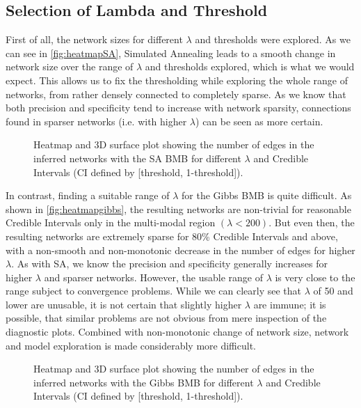 \subsection{Selection of Lambda and Threshold}
First of all, the network sizes for different $\lambda$ and thresholds were explored.
As we can see in \autoref{fig:heatmapSA}, Simulated Annealing leads to a smooth change in network size
over the range of $\lambda$ and thresholds explored, which is what we would expect.
This allows us to fix the thresholding while exploring the whole range of networks, from rather densely connected to completely sparse.
As we know that both precision and specificity tend to increase with network sparsity,
connections found in sparser networks (i.e. with higher $\lambda$) can be seen as more certain.
\begin{figure}[H]
	\centering
	\caption{Heatmap and 3D surface plot showing the number of edges in the inferred networks with the SA BMB for different $\lambda$ and Credible Intervals (\gls{CI} defined by [threshold, 1-threshold]).}
	
	\label{fig:heatmapSA}
\end{figure}


In contrast, finding a suitable range of $\lambda$ for the Gibbs \gls{BMB} is quite difficult.
As shown in \autoref{fig:heatmapgibbs},  the resulting networks are non-trivial for reasonable Credible Intervals only in the multi-modal region $(\lambda<200)$.
But even then, the resulting networks are extremely sparse for 80\% Credible Intervals and above,
with a non-smooth and non-monotonic decrease in the number of edges for higher $\lambda$.
As with SA, we know the precision and specificity generally increases for higher $\lambda$ and sparser networks.
However, the usable range of $\lambda$ is very close to the range subject to convergence problems.
While we can clearly see that $\lambda$ of 50 and lower are unusable, it is not certain that slightly higher $\lambda$
are immune; it is possible, that similar problems are not obvious from mere inspection of the diagnostic plots.
Combined with non-monotonic change of network size, network and model exploration is made considerably more difficult.
\begin{figure}[H]
	\centering
	\caption{Heatmap and 3D surface plot showing the number of edges in the inferred networks with the Gibbs BMB for different $\lambda$ and Credible Intervals (\gls{CI} defined by [threshold, 1-threshold]).}
	
	\label{fig:heatmapgibbs}
\end{figure}
\pagebreak

